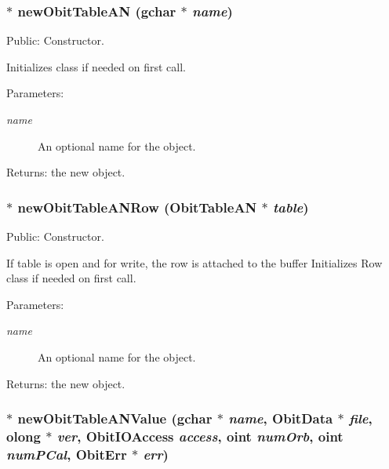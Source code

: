\subsubsection{$\ast$ new\-Obit\-Table\-AN (gchar $\ast$ {\em name})}\label{ObitTableAN_8c_a16}


Public: Constructor. 

Initializes class if needed on first call. \begin{Desc}
\item[Parameters:]
\begin{description}
\item[{\em name}]An optional name for the object. \end{description}
\end{Desc}
\begin{Desc}
\item[Returns:]the new object. \end{Desc}
\subsubsection{$\ast$ new\-Obit\-Table\-ANRow ({\bf Obit\-Table\-AN} $\ast$ {\em table})}\label{ObitTableAN_8c_a14}


Public: Constructor. 

If table is open and for write, the row is attached to the buffer Initializes Row class if needed on first call. \begin{Desc}
\item[Parameters:]
\begin{description}
\item[{\em name}]An optional name for the object. \end{description}
\end{Desc}
\begin{Desc}
\item[Returns:]the new object. \end{Desc}
\subsubsection{$\ast$ new\-Obit\-Table\-ANValue (gchar $\ast$ {\em name}, {\bf Obit\-Data} $\ast$ {\em file}, {\bf olong} $\ast$ {\em ver}, Obit\-IOAccess {\em access}, {\bf oint} {\em num\-Orb}, {\bf oint} {\em num\-PCal}, {\bf Obit\-Err} $\ast$ {\em err})}\label{ObitTableAN_8c_a18}


